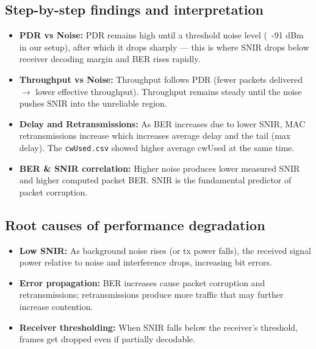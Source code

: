 \documentclass{rapport}
\begin{document}
\subsection{Step-by-step findings and interpretation}
\begin{itemize}
  \item \textbf{PDR vs Noise:} PDR remains high until a threshold noise level (~-91 dBm in our setup), after which it drops sharply — this is where SNIR drops below receiver decoding margin and BER rises rapidly.
  \item \textbf{Throughput vs Noise:} Throughput follows PDR (fewer packets delivered $\rightarrow$ lower effective throughput). Throughput remains steady until the noise pushes SNIR into the unreliable region.
  \item \textbf{Delay and Retransmissions:} As BER increases due to lower SNIR, MAC retransmissions increase which increases average delay and the tail (max delay). The \texttt{cwUsed.csv} showed higher average cwUsed at the same time.
  \item \textbf{BER \& SNIR correlation:} Higher noise produces lower measured SNIR and higher computed packet BER. SNIR is the fundamental predictor of packet corruption.
\end{itemize}

\subsection{Root causes of performance degradation}
\begin{itemize}
  \item \textbf{Low SNIR:} As background noise rises (or tx power falls), the received signal power relative to noise and interference drops, increasing bit errors.
  \item \textbf{Error propagation:} BER increases cause packet corruption and retransmissions; retransmissions produce more traffic that may further increase contention.
  \item \textbf{Receiver thresholding:} When SNIR falls below the receiver's threshold, frames get dropped even if partially decodable.
\end{itemize}
\end{document}
